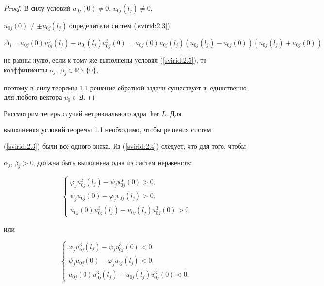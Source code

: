 \begin{proof}

В силу условий $u_{0j}(0){\neq} 0$, $u_{0j}(l_j){\neq} 0$,

\mbox{$u_{0j}(0){\neq} \pm u_{0j}(l_j)$} определители систем (\ref{svirid:2.3})

$$

\mathfrak{\Delta_j}=u_{0j}(0)u_{0j}^3(l_j)-u_{0j}(l_j)u_{0j}^3(0)=u_{0j}(0)u_{0j}(l_j)(u_{0j}(l_j)-u_{0j}(0))(u_{0j}(l_j)+u_{0j}(0))

$$

не равны нулю, если к тому же выполнены условия (\ref{svirid:2.5}), то коэффициенты $\alpha_j$, $\beta_j\in\mathbb{R}\backslash\{0\}$,

поэтому в~силу теоремы 1.1 решение обратной задачи существует и~единственно для любого вектора $u_{0}\in\mathfrak{U}$.

\end{proof}



Рассмотрим теперь случай нетривиального ядра $\ker L$. Для

выполнения ус\-ло\-вий теоремы 1.1 необходимо, чтобы решения систем

(\ref{svirid:2.3}) были все одного знака. Из (\ref{svirid:2.4}) следует, что для того, чтобы

$\alpha_j$, $\beta_j>0$, должна быть выполнена одна из систем неравенств:



\begin{equation}\label{svirid:2.6}

\left \{

\begin{array}{l}

    \varphi_ju_{0j}^3(l_j)-\psi_ju_{0j}^3(0)>0, \\

    \psi_ju_{0j}(0)-\varphi_ju_{0j}(l_j)>0, \\

    u_{0j}(0)u_{0j}^3(l_j)-u_{0j}(l_j)u_{0j}^3(0)>0

\end{array} \right.

\end{equation}

или

\begin{equation}\label{svirid:2.7}

\left \{

\begin{array}{l}

    \varphi_ju_{0j}^3(l_j)-\psi_ju_{0j}^3(0)<0, \\

    \psi_ju_{0j}(0)-\varphi_ju_{0j}(l_j)<0, \\

    u_{0j}(0)u_{0j}^3(l_j)-u_{0j}(l_j)u_{0j}^3(0)<0,

\end{array} \right.

\end{equation}

